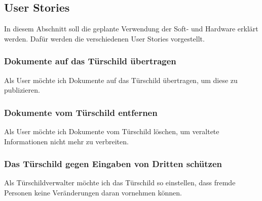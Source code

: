 \subsection{User Stories}
\label{sec:Usecases}
\begin{flushleft}
In diesem Abschnitt soll die geplante Verwendung der Soft- und Hardware erklärt werden.
Dafür werden die verschiedenen User Stories vorgestellt.



\subsubsection{Dokumente auf das Türschild übertragen} %
\label{ssub:Daten auf das Türschild übertragen}
Als User möchte ich Dokumente auf das Türschild übertragen, um diese zu publizieren. 

\subsubsection{Dokumente vom Türschild entfernen}
\label{ssub:Dokumente vom Speicher des Türschilds entfernen}
Als User möchte ich Dokumente vom Türschild löschen, um veraltete Informationen nicht mehr zu verbreiten.  

\subsubsection{Das Türschild gegen Eingaben von Dritten schützen}
\label{ssub:Das Türschild gegen Eingaben von Dritten schützen}
Als Türschildverwalter möchte ich das Türschild so einstellen, dass fremde Personen keine Veränderungen daran vornehmen können. 
\newline
\end{flushleft}






